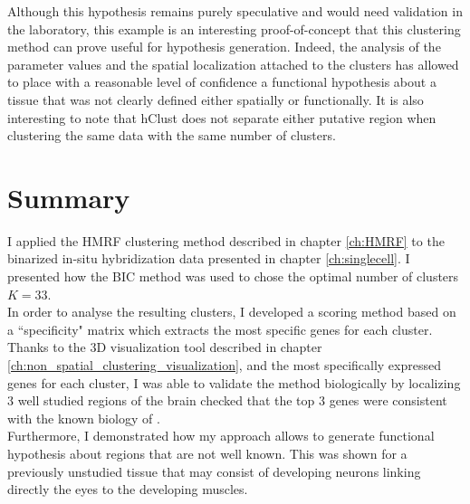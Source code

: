 	 Although this hypothesis remains purely speculative and would need validation in the laboratory, this example is an interesting proof-of-concept that this clustering method can prove useful for hypothesis generation. Indeed, the analysis of the parameter values and the spatial localization attached to the clusters has allowed to place with a reasonable level of confidence a functional hypothesis about a tissue that was not clearly defined either spatially or functionally. It is also interesting to note that hClust does not separate either putative region when clustering the same data with the same number of clusters. \\

\section{Summary}
	
I applied the HMRF clustering method described in chapter \ref{ch:HMRF} to the binarized in-situ hybridization data presented in chapter \ref{ch:singlecell}. I presented how the BIC method was used to chose the optimal number of clusters $K = 33$.\\

In order to analyse the resulting clusters, I developed a scoring method based on a ``specificity" matrix which extracts the most specific genes for each cluster. Thanks to the 3D visualization tool described in chapter \ref{ch:non_spatial_clustering_visualization}, and the most specifically expressed genes for each cluster, I was able to validate the method biologically by localizing 3 well studied regions of the brain checked that the top 3 genes were consistent with the known biology of \platy{}.\\

Furthermore, I demonstrated how my approach allows to generate functional hypothesis about regions that are not well known. This was shown for a previously unstudied tissue that may consist of developing neurons linking directly the eyes to the developing muscles.

